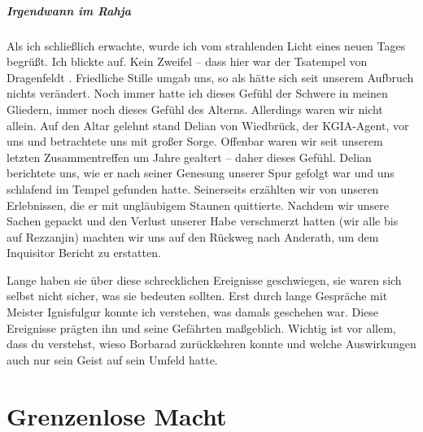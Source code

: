 \paragraph{Irgendwann im Rahja}
Als ich schließlich erwachte, wurde ich vom strahlenden Licht eines neuen Tages begrüßt. Ich blickte auf. Kein Zweifel -- dass hier war der Tsatempel von Dragenfeldt . Friedliche Stille umgab uns, so als hätte sich seit unserem Aufbruch nichts verändert. Noch immer hatte ich dieses Gefühl der Schwere in meinen Gliedern, immer noch dieses Gefühl des Alterns. Allerdings waren wir nicht allein. Auf den Altar gelehnt stand Delian von Wiedbrück, der KGIA-Agent, vor uns und betrachtete uns mit großer Sorge. Offenbar waren wir seit unserem letzten Zusammentreffen um Jahre gealtert -- daher dieses Gefühl. Delian berichtete uns, wie er nach seiner Genesung unserer Spur gefolgt war und uns schlafend im Tempel gefunden hatte. Seinerseits erzählten wir von unseren Erlebnissen, die er mit ungläubigem Staunen quittierte. Nachdem wir unsere Sachen gepackt und den Verlust unserer Habe verschmerzt hatten (wir alle bis auf Rezzanjin) machten wir uns auf den Rückweg nach Anderath, um dem Inquisitor Bericht zu erstatten.\par

Lange haben sie über diese schrecklichen Ereignisse geschwiegen, sie waren sich selbst nicht sicher, was sie bedeuten sollten. Erst durch lange Gespräche mit Meister Ignisfulgur konnte ich verstehen, was damals geschehen war. Diese Ereignisse prägten ihn und seine Gefährten maßgeblich. Wichtig ist vor allem, dass du verstehst, wieso Borbarad zurückkehren konnte und welche Auswirkungen auch nur sein Geist auf sein Umfeld hatte.\par



\chapter{Grenzenlose Macht}

